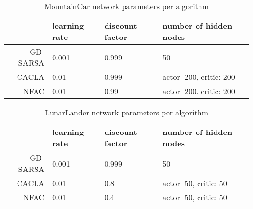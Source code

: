 
\begin{table}
\centering
\label{tab:mntparam}
\begin{tabular}{r|llll}
                     & learning rate & discount factor & number of hidden nodes \\\hline
GD-SARSA & 0.001          & 0.999               & 50         \\
CACLA & 0.01          & 0.999               & actor: 200, critic: 200         \\
NFAC    & 0.01          & 0.99              & actor: 200, critic: 200        
\end{tabular}
\caption{MountainCar network parameters per algorithm}
\end{table}

\begin{table}
\centering
\label{tab:lunarparam}
\begin{tabular}{r|llll}
                     & learning rate & discount factor & number of hidden nodes \\\hline
GD-SARSA & 0.001          & 0.999               & 50         \\
CACLA & 0.01          & 0.8               & actor: 50, critic: 50         \\
NFAC    & 0.01          & 0.4              & actor: 50, critic: 50        
\end{tabular}
\caption{LunarLander network parameters per algorithm}
\end{table}

